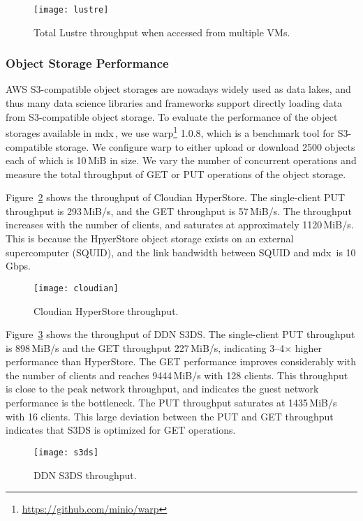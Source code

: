 \documentclass[a4paper,twoside]{article}
\newcommand{\mdx}{mdx\,\uppercase\expandafter{\romannumeral 2\relax}}
\begin{document}
\begin{figure}
    \centering
    \texttt{[image: lustre]}%
    \caption{Total Lustre throughput when accessed from multiple VMs.}\label{fig:lustre}
\end{figure}

\subsubsection{Object Storage Performance}

AWS S3-compatible object storages are nowadays widely used as data lakes, and thus many data science
libraries and frameworks support directly loading data from S3-compatible object storage.
To evaluate the performance of the object storages available in \mdx{}, we use
warp\footnote{\url{https://github.com/minio/warp}} 1.0.8, which is a benchmark tool for
S3-compatible storage. We configure warp to either upload or download 2500 objects each of which
is 10\,MiB in size. We vary the number of concurrent operations and measure the total
throughput of GET or PUT operations of the object storage.

Figure~\ref{fig:cloudian} shows the throughput of Cloudian HyperStore. The single-client PUT
throughput is 293\,MiB/s, and the GET throughput is 57\,MiB/s. The throughput increases with the
number of clients, and saturates at approximately 1120\,MiB/s. This is because the HpyerStore object
storage exists on an external supercomputer (SQUID), and the link bandwidth between SQUID and \mdx{}
is 10\,Gbps.

\begin{figure}
    \centering
    \texttt{[image: cloudian]}%
    \caption{Cloudian HyperStore throughput.}\label{fig:cloudian}
\end{figure}

Figure~\ref{fig:s3ds} shows the throughput of DDN S3DS. The single-client PUT throughput is
898\,MiB/s and the GET throughput 227\,MiB/s, indicating 3--4$\times$ higher performance than
HyperStore. The GET performance improves considerably with the number of clients and reaches
9444\,MiB/s with 128 clients. This throughput is close to the peak network throughput,
and indicates the guest network performance is the bottleneck. The PUT
throughput saturates at 1435\,MiB/s with 16 clients. This large deviation between the PUT and GET
throughput indicates that S3DS is optimized for GET operations.

\begin{figure}
    \centering
    \texttt{[image: s3ds]}%
    \caption{DDN S3DS throughput.}\label{fig:s3ds}
\end{figure}
\end{document}
